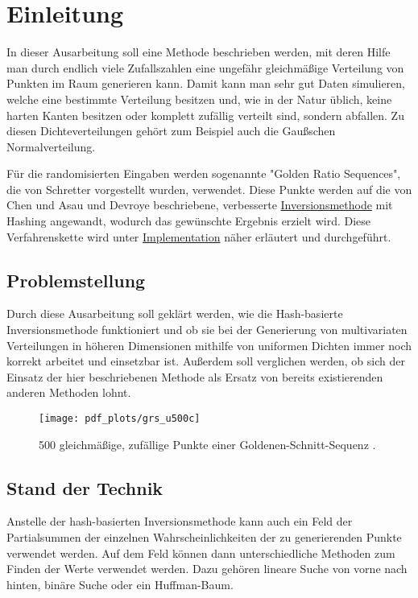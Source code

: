 \section{Einleitung}

In dieser Ausarbeitung soll eine Methode beschrieben werden, mit deren Hilfe man durch endlich viele Zufallszahlen 
eine ungefähr gleichmäßige Verteilung von Punkten im Raum generieren kann. Damit kann man sehr gut Daten simulieren, 
welche eine bestimmte Verteilung besitzen und, wie in der Natur üblich, keine harten Kanten besitzen oder komplett 
zufällig verteilt sind, sondern abfallen. Zu diesen Dichteverteilungen gehört zum Beispiel auch die Gaußschen Normalverteilung. 

Für die randomisierten Eingaben werden sogenannte "Golden Ratio Sequences", die von Schretter 
\cite{schretter-golden_ratio_sequences-2012} vorgestellt wurden, verwendet. Diese Punkte werden auf die von Chen 
und Asau \cite{chen_asau-generating_random_variates-1974} und Devroye \cite{devroye-non_uniform_random_variate-1986} 
beschriebene, verbesserte \hyperref[funktion]{Inversionsmethode} mit Hashing angewandt, wodurch das gewünschte Ergebnis 
erzielt wird. Diese Verfahrenskette wird unter \hyperref[impl]{Implementation} näher erläutert und durchgeführt. 


\subsection{Problemstellung}
Durch diese Ausarbeitung soll geklärt werden, wie die Hash-basierte Inversionsmethode funktioniert und ob  
sie bei der Generierung von multivariaten Verteilungen in höheren Dimensionen mithilfe von uniformen Dichten immer noch 
korrekt arbeitet und einsetzbar ist. Außerdem soll verglichen werden, ob sich der Einsatz der hier beschriebenen 
Methode als Ersatz von bereits existierenden anderen Methoden lohnt.

\begin{figure}
    \centering
    \texttt{[image: pdf\_plots/grs\_u500c]}
    \caption{500 gleichmäßige, zufällige Punkte einer Goldenen-Schnitt-Sequenz \cite{schretter-golden_ratio_sequences-2012}.}
\end{figure}

\subsection{Stand der Technik}
Anstelle der hash-basierten Inversionsmethode kann auch ein Feld der Partialsummen der einzelnen Wahrscheinlichkeiten 
der zu generierenden Punkte verwendet werden. Auf dem Feld können dann unterschiedliche Methoden zum Finden der Werte 
verwendet werden. Dazu gehören lineare Suche von vorne nach hinten, binäre Suche oder ein Huffman-Baum.

